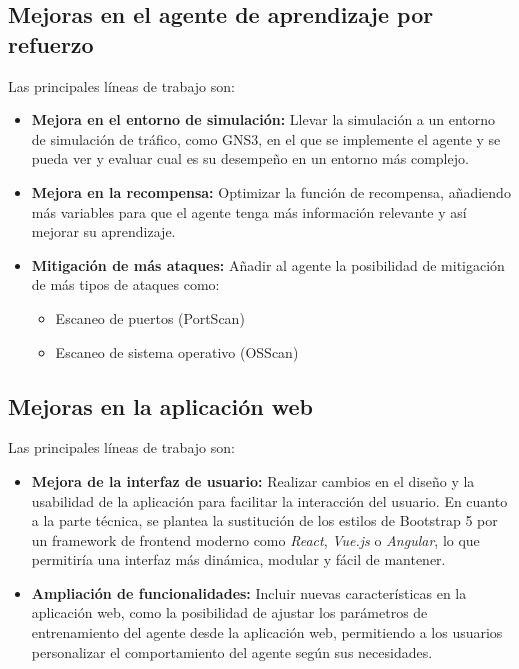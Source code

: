 \subsection{Mejoras en el agente de aprendizaje por refuerzo}
Las principales líneas de trabajo son:
\begin{itemize}
    \item \textbf{Mejora en el entorno de simulación:} Llevar la simulación a un entorno de simulación de tráfico, como GNS3, en el que se implemente el agente y se pueda ver y evaluar cual es su desempeño en un entorno más complejo.
    \item \textbf{Mejora en la recompensa:} Optimizar la función de recompensa, añadiendo más variables para que el agente tenga más información relevante y así mejorar su aprendizaje.
    \item \textbf{Mitigación de más ataques:} Añadir al agente la posibilidad de mitigación de más tipos de ataques como:
    \begin{itemize}
        \item Escaneo de puertos (PortScan)
        \item Escaneo de sistema operativo (OSScan)
    \end{itemize}
\end{itemize}

\subsection{Mejoras en la aplicación web}
Las principales líneas de trabajo son:
\begin{itemize}
    \item \textbf{Mejora de la interfaz de usuario:} Realizar cambios en el diseño y la usabilidad de la aplicación para facilitar la interacción del usuario. En cuanto a la parte técnica, se plantea la sustitución de los estilos de Bootstrap 5 por un framework de frontend moderno como \textit{React}, \textit{Vue.js} o \textit{Angular}, lo que permitiría una interfaz más dinámica, modular y fácil de mantener.
    \item \textbf{Ampliación de funcionalidades:} Incluir nuevas características en la aplicación web, como la posibilidad de ajustar los parámetros de entrenamiento del agente desde la aplicación web, permitiendo a los usuarios personalizar el comportamiento del agente según sus necesidades.
\end{itemize}
